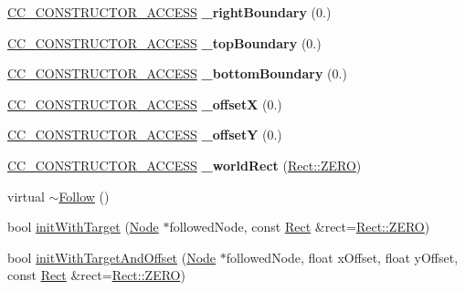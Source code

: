 \begin{DoxyCompactItemize}
\item 
\mbox{\label{classFollow_a8fee41024e7aa9790ef089cb24eba765}} 
\hyperlink{_2cocos2d_2cocos_2base_2ccConfig_8h_a25ef1314f97c35a2ed3d029b0ead6da0}{C\+C\+\_\+\+C\+O\+N\+S\+T\+R\+U\+C\+T\+O\+R\+\_\+\+A\+C\+C\+E\+SS} {\bfseries \+\_\+right\+Boundary} (0.)
\item 
\mbox{\label{classFollow_a8d17be8940842ea54cd6ea8bfe90c973}} 
\hyperlink{_2cocos2d_2cocos_2base_2ccConfig_8h_a25ef1314f97c35a2ed3d029b0ead6da0}{C\+C\+\_\+\+C\+O\+N\+S\+T\+R\+U\+C\+T\+O\+R\+\_\+\+A\+C\+C\+E\+SS} {\bfseries \+\_\+top\+Boundary} (0.)
\item 
\mbox{\label{classFollow_adaa4a25ca4b860e0de117d03d8c4285f}} 
\hyperlink{_2cocos2d_2cocos_2base_2ccConfig_8h_a25ef1314f97c35a2ed3d029b0ead6da0}{C\+C\+\_\+\+C\+O\+N\+S\+T\+R\+U\+C\+T\+O\+R\+\_\+\+A\+C\+C\+E\+SS} {\bfseries \+\_\+bottom\+Boundary} (0.)
\item 
\mbox{\label{classFollow_a302e7cbb0b36e60af23653453e630a1a}} 
\hyperlink{_2cocos2d_2cocos_2base_2ccConfig_8h_a25ef1314f97c35a2ed3d029b0ead6da0}{C\+C\+\_\+\+C\+O\+N\+S\+T\+R\+U\+C\+T\+O\+R\+\_\+\+A\+C\+C\+E\+SS} {\bfseries \+\_\+offsetX} (0.)
\item 
\mbox{\label{classFollow_ae51fac2d10075944998612c0045801d0}} 
\hyperlink{_2cocos2d_2cocos_2base_2ccConfig_8h_a25ef1314f97c35a2ed3d029b0ead6da0}{C\+C\+\_\+\+C\+O\+N\+S\+T\+R\+U\+C\+T\+O\+R\+\_\+\+A\+C\+C\+E\+SS} {\bfseries \+\_\+offsetY} (0.)
\item 
\mbox{\label{classFollow_aa5b6cdec6fa350e2be761b0de40ca192}} 
\hyperlink{_2cocos2d_2cocos_2base_2ccConfig_8h_a25ef1314f97c35a2ed3d029b0ead6da0}{C\+C\+\_\+\+C\+O\+N\+S\+T\+R\+U\+C\+T\+O\+R\+\_\+\+A\+C\+C\+E\+SS} {\bfseries \+\_\+world\+Rect} (\hyperlink{classRect_a590be46e60027b2ca0f62a457f91a83e}{Rect\+::\+Z\+E\+RO})
\item 
virtual \hyperlink{classFollow_af863ea889c89a53632c62043f96d0397}{$\sim$\+Follow} ()
\item 
bool \hyperlink{classFollow_a71644134a18ece1b4367910d952872f6}{init\+With\+Target} (\hyperlink{classNode}{Node} $\ast$followed\+Node, const \hyperlink{classRect}{Rect} \&rect=\hyperlink{classRect_a590be46e60027b2ca0f62a457f91a83e}{Rect\+::\+Z\+E\+RO})
\item 
bool \hyperlink{classFollow_ad9a776217489f9a9d545df6f7cf6e7bb}{init\+With\+Target\+And\+Offset} (\hyperlink{classNode}{Node} $\ast$followed\+Node, float x\+Offset, float y\+Offset, const \hyperlink{classRect}{Rect} \&rect=\hyperlink{classRect_a590be46e60027b2ca0f62a457f91a83e}{Rect\+::\+Z\+E\+RO})
\end{DoxyCompactItemize}
